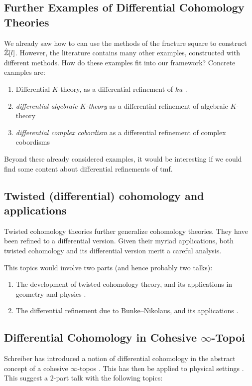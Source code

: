 \documentclass[10pt]{amsart}
\begin{document}
\subsection{Further Examples of Differential Cohomology Theories} \label{subsec:examples}
We already saw how to can use the methods of the fracture square to construct $\hat{\mathbb{Z}}[l]$. However, the literature contains many other examples, constructed with different methods. How do these examples fit into our framework? Concrete examples are:
\begin{enumerate}
  \item Differential $K$-theory, as a differential refinement of $ku$  \cite{hopkinssinger2005diffcoh}.
  \item  \emph{differential algebraic $K$-theory} as a differential refinement of algebraic $K$-theory \cite{bunkegepner2021diffktheory}
  \item \emph{differential complex cobordism} as a differential refinement of complex cobordisms \cite{bunkeschickschroederwiethaup2009landweber}
\end{enumerate}

Beyond these already considered examples, it would be interesting if we could find some content about differential refinements of tmf.

\subsection{Twisted (differential) cohomology and applications} \label{subsec:twisted}
Twisted cohomology theories further generalize cohomology theories. They have been refined to a differential version. Given their myriad applications, both twisted cohomology and its differential version merit a careful analysis.

This topics would involve two parts (and hence probably two talks):
\begin{enumerate}
  \item The development of twisted cohomology theory, and its applications in geometry and physics \cite{rosenberg2024twistedcohomology}. 
  \item The differential refinement due to Bunke--Nikolaus, and its applications \cite{bunkenikolaus2019twisted}.
\end{enumerate}

\subsection{Differential Cohomology in Cohesive \texorpdfstring{$\infty$}{oo}-Topoi} \label{subsec:cohesion}
Schreiber has introduced a notion of differential cohomology in the abstract concept of a cohesive $\infty$-topos \cite{schreiber2013differentialcohomology}. This has then be applied to physical settings \cite{fiorenzasatischreiber2024charactermap}. This suggest a $2$-part talk with the following topics:
\end{document}

